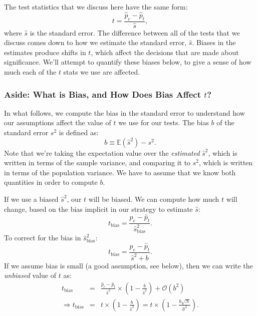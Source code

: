 \documentclass{article}
\numberwithin{equation}{section}
\begin{document}
The test statistics that we discuss here have the same form:
\begin{equation} \label{general_t_stat}
	t = \frac{\hat{p}_c - \hat{p}_t}{\hat{s}},
\end{equation}
where $\hat{s}$ is the standard error. The difference between all of the tests that we discuss comes down to how we estimate the standard error, $\hat{s}$. Biases in the estimates produce shifts in $t$, which affect the decisions that are made about significance. We'll attempt to quantify these biases below, to give a sense of how much each of the $t$ stats we use are affected.

\subsubsection{Aside: What is Bias, and How Does Bias Affect $t$?}

In what follows, we compute the bias in the standard error to understand how our assumptions affect the value of $t$ we use for our tests. The bias $b$ of the standard error $s^2$ is defined as:
\begin{equation}
	b \equiv \mathbb{E}(\hat{s}^2) - s^2.
\end{equation}
Note that we're taking the expectation value over the \textit{estimated} $\hat{s}^2$, which is written in terms of the sample variance, and comparing it to $s^2$, which is written in terms of the population variance. We have to assume that we know both quantities in order to compute $b$.

If we use a biased $\hat{s}^2$, our $t$ will be biased. We can compute how much $t$ will change, based on the bias implicit in our strategy to estimate $\hat{s}$:
\begin{equation}
	t_{\mathrm{bias}} = \frac{\hat{p}_c - \hat{p}_t}{\hat{s}_{\mathrm{bias}}^2}.
\end{equation}
To correct for the bias in $\hat{s}^2_{\mathrm{bias}}$:
\begin{equation}
	t_{\mathrm{bias}} = \frac{\hat{p}_c - \hat{p}_t}{\hat{s}^2 + b}.
\end{equation}
If we assume bias is small (a good assumption, see below), then we can write the \textit{unbiased} value of $t$ as:
\begin{eqnarray} \nonumber \label{biased_t}
	t_{\mathrm{bias}} &=& \frac{\hat{p}_c - \hat{p}_t}{\hat{s}^2} \times \left(1 - \frac{b}{\hat{s}^2}\right) + \mathcal{O}(b^2) \\
	\Rightarrow t_{\mathrm{bias}} &=& t \times \left(1 - \frac{b}{\hat{s}^2}\right) = t \times \left(1 - \frac{b\sqrt{N}}{\hat{\sigma}^2}\right).
\end{eqnarray}
\end{document}
